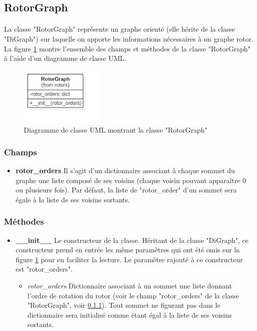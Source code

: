 \documentclass{article}
\begin{document}
	\subsection{RotorGraph}
	\label{sec:RotorGraph}
	\paragraph*{}
	La classe "RotorGraph" représente un graphe orienté (elle hérite de la classe "DiGraph") sur laquelle on apporte les informations nécessaires à un graphe rotor. La figure \ref{fig:diagClassRotorGraph} montre l'ensemble des champs et méthodes de la classe "RotorGraph" à l'aide d'un diagramme de classe UML.
	
	\begin{figure}[h]
		\includegraphics[width=4cm]{diagClassRotorGraph.png}
		\centering
		\caption{Diagramme de classe UML montrant la classe "RotorGraph"}
		\label{fig:diagClassRotorGraph}
	\end{figure}
	
	\subsubsection{Champs}
	\label{sec:RotorGraph-Champ}
	\begin{itemize}	
		\item \textbf{rotor\_orders}\newline
		Il s'agit d'un dictionnaire associant à chaque sommet du graphe une liste composé de ses voisins (chaque voisin pouvant apparaître 0 ou plusieurs fois). Par défaut, la liste de "rotor\_order" d'un sommet sera égale à la liste de ses voisins sortants.
	\end{itemize}

	\subsubsection{Méthodes}
	\begin{itemize}
		\item \textbf{\_\_init\_\_}\newline
		Le constructeur de la classe. Héritant de la classe "DiGraph", ce constructeur prend en entrée les même paramètres qui ont été omis sur la figure \ref{fig:diagClassRotorGraph} pour en faciliter la lecture. Le paramètre rajouté à ce constructeur est "rotor\_orders".
		\begin{itemize}
			\item \textit{rotor\_orders}\newline
			Dictionnaire associant à un sommet une liste donnant l'ordre de rotation du rotor (voir le champ "rotor\_orders" de la classe "RotorGraph", voir \ref{sec:RotorGraph-Champ}). Tout sommet ne figurant pas dans le dictionnaire sera initialisé comme étant égal à la liste de ses voisins sortants. 
		\end{itemize}
	\end{itemize}
\end{document}
